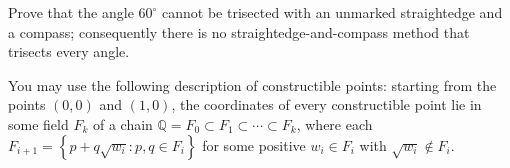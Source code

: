 Prove that the angle $60^\circ$ cannot be trisected with an unmarked straightedge and a compass; consequently there is no straightedge-and-compass method that trisects every angle.

You may use the following description of constructible points: starting from the points $(0,0)$ and $(1,0)$, the coordinates of every constructible point lie in some field $F_k$ of a chain $\mathbb Q=F_0\subset F_1\subset\cdots\subset F_k$, where each $F_{i+1}=\left\{p+q\sqrt{w_i}:p,q\in F_i\right\}$ for some positive $w_i\in F_i$ with $\sqrt{w_i}\notin F_i$.
